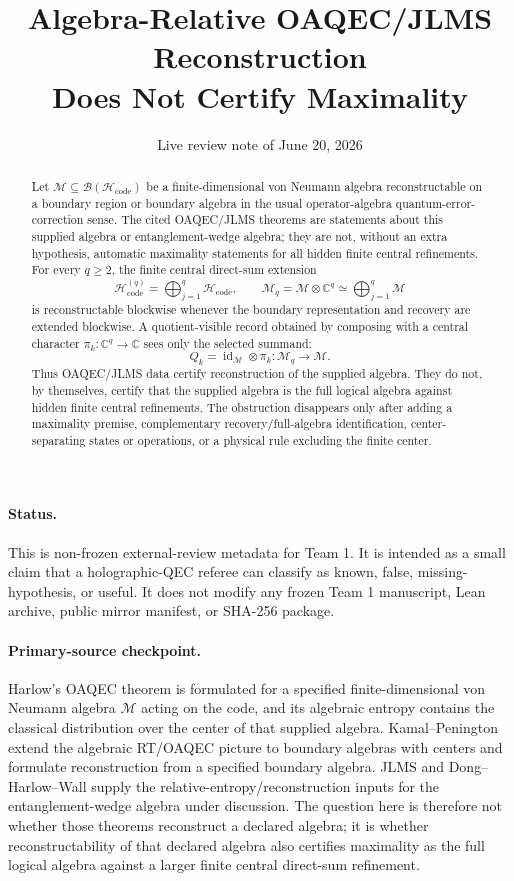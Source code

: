 \documentclass[12pt]{article}
\title{Algebra-Relative OAQEC/JLMS Reconstruction\\
Does Not Certify Maximality}
\author{}
\date{Live review note of June 20, 2026}
\theoremstyle{remark}
\newcommand{\B}{\mathcal B}
\newcommand{\C}{\mathbb C}
\newcommand{\Hcode}{\mathcal H_{\mathrm{code}}}
\newcommand{\M}{\mathcal M}
\newcommand{\id}{\operatorname{id}}
\begin{document}
\maketitle

\begin{abstract}
Let \(\M\subseteq\B(\Hcode)\) be a finite-dimensional von Neumann algebra
reconstructable on a boundary region or boundary algebra in the usual
operator-algebra quantum-error-correction sense.  The cited OAQEC/JLMS
theorems are statements about this supplied algebra or entanglement-wedge
algebra; they are not, without an extra hypothesis, automatic maximality
statements for all hidden finite central refinements.  For every \(q\geq 2\), the
finite central direct-sum extension
\[
  \Hcode^{(q)}=\bigoplus_{j=1}^{q}\Hcode,\qquad
  \M_q=\M\otimes \C^q\simeq \bigoplus_{j=1}^{q}\M
\]
is reconstructable blockwise whenever the boundary representation and recovery
are extended blockwise.  A quotient-visible record obtained by composing with
a central character \(\pi_k:\C^q\to\C\) sees only the selected summand:
\[
  Q_k=\id_{\M}\otimes \pi_k:\M_q\to \M.
\]
Thus OAQEC/JLMS data certify reconstruction of the supplied algebra.  They do
not, by themselves, certify that the supplied algebra is the full logical
algebra against hidden finite central refinements.  The obstruction disappears
only after adding a maximality premise, complementary recovery/full-algebra
identification, center-separating states or operations, or a physical rule
excluding the finite center.
\end{abstract}

\paragraph{Status.}
This is non-frozen external-review metadata for Team 1.  It is intended as a
small claim that a holographic-QEC referee can classify as known, false,
missing-hypothesis, or useful.  It does not modify any frozen Team 1
manuscript, Lean archive, public mirror manifest, or SHA-256 package.

\paragraph{Primary-source checkpoint.}
Harlow's OAQEC theorem is formulated for a specified finite-dimensional
von Neumann algebra \(\M\) acting on the code, and its algebraic entropy
contains the classical distribution over the center of that supplied algebra.
Kamal--Penington extend the algebraic RT/OAQEC picture to boundary algebras
with centers and formulate reconstruction from a specified boundary algebra.
JLMS and Dong--Harlow--Wall supply the relative-entropy/reconstruction inputs
for the entanglement-wedge algebra under discussion.  The question here is
therefore not whether those theorems reconstruct a declared algebra; it is
whether reconstructability of that declared algebra also certifies maximality
as the full logical algebra against a larger finite central direct-sum
refinement.
\end{document}
